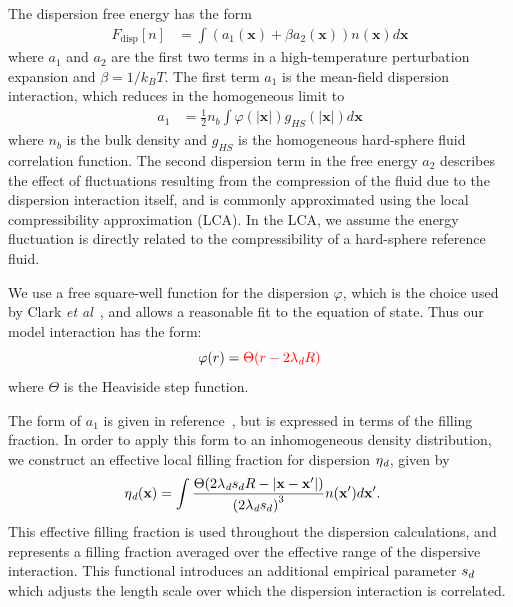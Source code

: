 \documentclass[letterpaper,twocolumn,amsmath,amssymb,prb]{revtex4-1}
\newcommand{\xx}{\textbf{x}}
\begin{document}
The dispersion free energy has the form~\cite{gil-villegas-1997-SAFT-VR}
\begin{align}
  F_\text{disp}[n] &= \int \left(a_1(\xx) + \beta a_2(\xx)\right)n(\xx)d\xx
\end{align}
where $a_1$ and $a_2$ are the first two terms in a high-temperature
perturbation expansion and $\beta=1/k_BT$.  The first term $a_1$ is 
the mean-field dispersion
interaction, which reduces in the homogeneous limit to
\begin{align}\label{eq:A1-simple}
  a_1 &= \frac12 n_b \int \varphi(\left|\xx\right|)
  g_{HS}(\left|\xx\right|) d\xx
\end{align}
where $n_b$ is the bulk density and $g_{HS}$ is the homogeneous
hard-sphere fluid correlation function.
The second dispersion term in the free energy $a_2$ describes the
effect of fluctuations resulting from the compression of the fluid due
to the dispersion interaction itself, and is commonly approximated
using the local compressibility approximation (LCA). In the LCA,
we assume the energy fluctuation is directly related to the
compressibility of a hard-sphere reference fluid\cite{barker1976liquid}.

We use a free square-well function for the dispersion $\varphi$, which
is the choice used by Clark \emph{et al}~\cite{clark2006developing},
and allows a reasonable fit to the equation of state.  Thus our model
interaction has the form:
\begin{equation}
  \varphi(r) = \color{red}\Theta(r-2 \lambda_\textit{d} R)
\end{equation}
where $\Theta$ is the Heaviside step function.

The form of $a_1$ is given in
reference~\cite{gil-villegas-1997-SAFT-VR}, but is expressed in terms
of the filling fraction.  In order to apply this form to an
inhomogeneous density distribution, we construct an effective local
filling fraction for dispersion $\eta_\textit{d}$, given by
\begin{align}
  \etadisp(\xx) &=
  \int \frac{\Theta(2\lambdadisp\lscale R - \left|\xx-\xx'\right|)}{
             \left(2\lambdadisp\lscale\right)^3} n(\xx') d\xx'.
\end{align}
This effective filling fraction is used throughout the dispersion
calculations, and represents a filling fraction averaged over the
effective range of the dispersive interaction.  This functional
introduces an additional empirical parameter $s_d$ which adjusts
the length scale over which the dispersion interaction is correlated.
\end{document}
